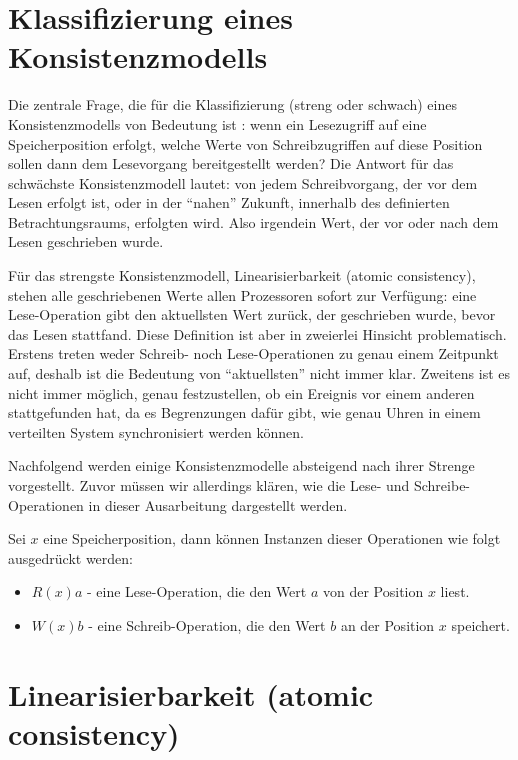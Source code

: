 \section{Klassifizierung eines Konsistenzmodells}

Die zentrale Frage, die für die Klassifizierung (streng oder schwach) eines Konsistenzmodells von Bedeutung ist \cite{Coulouris:02}: wenn ein Lesezugriff auf eine Speicherposition erfolgt, welche Werte von Schreibzugriffen auf diese Position sollen dann dem Lesevorgang bereitgestellt werden? Die Antwort für das schwächste Konsistenzmodell lautet: von jedem Schreibvorgang, der vor dem Lesen erfolgt ist, oder in der "`nahen"' Zukunft, innerhalb des definierten Betrachtungsraums, erfolgten wird. Also irgendein Wert, der vor oder nach dem Lesen geschrieben wurde.

Für das strengste Konsistenzmodell, Linearisierbarkeit (atomic consistency), stehen alle geschriebenen Werte allen Prozessoren sofort zur Verfügung: eine Lese-Operation gibt den aktuellsten Wert zurück, der geschrieben wurde, bevor das Lesen stattfand. Diese Definition ist aber in zweierlei Hinsicht problematisch. Erstens treten weder Schreib- noch Lese-Operationen zu genau einem Zeitpunkt auf, deshalb ist die Bedeutung von "`aktuellsten"' nicht immer klar. Zweitens ist es nicht immer möglich, genau festzustellen, ob ein Ereignis vor einem anderen stattgefunden hat, da es Begrenzungen dafür gibt, wie genau Uhren in einem verteilten System synchronisiert werden können.

Nachfolgend werden einige Konsistenzmodelle absteigend nach ihrer Strenge vorgestellt. Zuvor müssen wir allerdings klären, wie die Lese- und Schreibe-Operationen in dieser Ausarbeitung dargestellt werden.

Sei $x$ eine Speicherposition, dann können Instanzen dieser Operationen wie folgt ausgedrückt werden:
\begin{itemize}
	\item $R(x)a$ - eine Lese-Operation, die den Wert $a$ von der Position $x$ liest.
	\item $W(x)b$ - eine Schreib-Operation, die den Wert $b$ an der Position $x$ speichert.
\end{itemize}

\section{Linearisierbarkeit (atomic consistency)}

